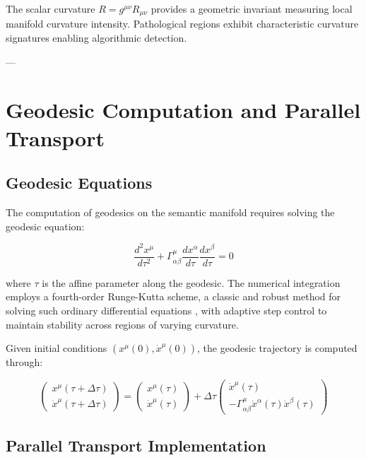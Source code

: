 The scalar curvature $R = g^{\mu\nu} R_{\mu\nu}$ provides a geometric invariant measuring local manifold curvature intensity. Pathological regions exhibit characteristic curvature signatures enabling algorithmic detection.

---

\section{Geodesic Computation and Parallel Transport}

\subsection{Geodesic Equations}

The computation of geodesics on the semantic manifold requires solving the geodesic equation:

\begin{equation}
\frac{d^2 x^{\mu}}{d\tau^2} + \Gamma^{\mu}_{\alpha\beta} \frac{dx^{\alpha}}{d\tau} \frac{dx^{\beta}}{d\tau} = 0
\end{equation}

where $\tau$ is the affine parameter along the geodesic. The numerical integration employs a fourth-order Runge-Kutta scheme, a classic and robust method for solving such ordinary differential equations \autocite{Runge1895, Kutta1901}, with adaptive step control to maintain stability across regions of varying curvature.

Given initial conditions $(x^{\mu}(0), \dot{x}^{\mu}(0))$, the geodesic trajectory is computed through:

\begin{equation}
\begin{pmatrix} x^{\mu}(\tau + \Delta\tau) \\ \dot{x}^{\mu}(\tau + \Delta\tau) \end{pmatrix} = \begin{pmatrix} x^{\mu}(\tau) \\ \dot{x}^{\mu}(\tau) \end{pmatrix} + \Delta\tau \begin{pmatrix} \dot{x}^{\mu}(\tau) \\ -\Gamma^{\mu}_{\alpha\beta} \dot{x}^{\alpha}(\tau) \dot{x}^{\beta}(\tau) \end{pmatrix}
\end{equation}

\subsection{Parallel Transport Implementation}

